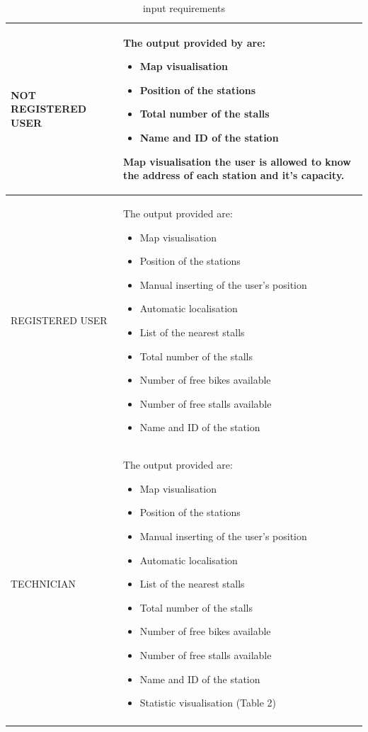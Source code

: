 \documentclass{article}
\begin{document}
\begin{longtable}{|l|p{}|}
            \hline
            NOT REGISTERED USER &  The output provided by are:
            \begin{itemize}
            \item Map visualisation
            \item Position of the stations
            \item Total number of the stalls
            \item Name and ID of the station 
            \end{itemize}
            Map visualisation the user is allowed to know the address of each station and it's capacity. \\ 
            \hline
            REGISTERED USER  & The output provided are:
            \begin{itemize}
            \item Map visualisation
            \item Position of the stations
            \item Manual inserting of the user's position
            \item Automatic localisation
            \item List of the nearest stalls
            \item Total number of the stalls
            \item Number of free bikes available
            \item Number of free stalls available
            \item Name and ID of the station 
            \end{itemize}
            \\
            \hline
            TECHNICIAN &  The output provided are:
            \begin{itemize}
            \item Map visualisation
            \item Position of the stations
            \item Manual inserting of the user's position
            \item Automatic localisation
            \item List of the nearest stalls
            \item Total number of the stalls
            \item Number of free bikes available
            \item Number of free stalls available
            \item Name and ID of the station 
            \item Statistic visualisation (Table 2)
            \end{itemize}
            \\
            \hline
\caption{input requirements} \\
\end{longtable}
\end{document}
